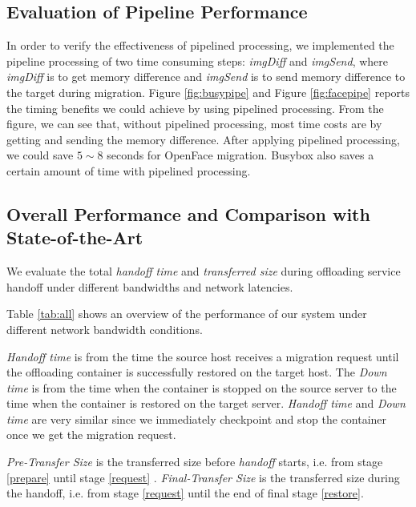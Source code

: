 \subsection{Evaluation of Pipeline Performance}


In order to verify the effectiveness of pipelined processing, we implemented the pipeline processing of two time consuming steps: \textit{imgDiff} and \textit{imgSend}, where \textit{imgDiff} is to get memory difference and \textit{imgSend} is to send memory difference to the target during migration. 
Figure \ref{fig:busypipe} and Figure \ref{fig:facepipe} reports the timing benefits we could achieve by using pipelined processing. From the figure, we can see that, without pipelined processing, most time costs are by getting and sending the memory difference. After applying pipelined processing, we could save $5\sim 8$ seconds for OpenFace migration. Busybox also saves a certain amount of time with pipelined processing.


\subsection{Overall Performance and Comparison with State-of-the-Art}
We evaluate the total \textit{handoff time} and \textit{transferred size } during offloading service handoff under different bandwidths and network latencies. 

Table \ref{tab:all} shows an overview of the performance of our system under different network bandwidth conditions.
% 




\textit{Handoff time}
is from the time the source host receives a migration request until the offloading container is successfully restored on the target host. The \textit{Down time} is from the time when the container is stopped on the source server to the time when the container is restored on the target server. \textit{Handoff time} and \textit{Down time} are very similar since we immediately checkpoint and stop the container once we get the migration request. 

\textit{Pre-Transfer Size} is the transferred size before \textit{handoff} starts, i.e. from stage \ref{prepare} until stage \ref{request} . \textit{Final-Transfer Size} is the transferred size during the handoff, i.e. from stage \ref{request} until the end of final stage \ref{restore}.

